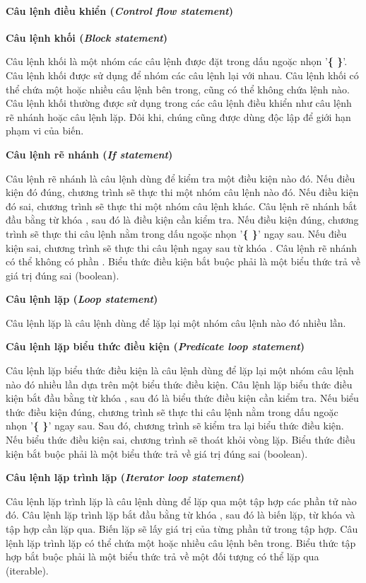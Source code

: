 \paragraph{Câu lệnh điều khiển (\textit{Control flow statement})}

\noindent\textbf{Câu lệnh khối (\textit{Block statement})}

\regexblockstmt

Câu lệnh khối là một nhóm các câu lệnh được đặt trong dấu ngoặc nhọn '\textbf{\{ \}}'. Câu lệnh khối được sử dụng để nhóm các câu lệnh lại với nhau. Câu lệnh khối có thể chứa một hoặc nhiều câu lệnh bên trong, cũng có thể không chứa lệnh nào. Câu lệnh khối thường được sử dụng trong các câu lệnh điều khiển như câu lệnh rẽ nhánh hoặc câu lệnh lặp. Đôi khi, chúng cũng được dùng độc lập để giới hạn phạm vi của biến.

\noindent\textbf{Câu lệnh rẽ nhánh (\textit{If statement})}

\regexifstmt

Câu lệnh rẽ nhánh là câu lệnh dùng để kiểm tra một điều kiện nào đó. Nếu điều kiện đó đúng, chương trình sẽ thực thi một nhóm câu lệnh nào đó. Nếu điều kiện đó sai, chương trình sẽ thực thi một nhóm câu lệnh khác. Câu lệnh rẽ nhánh bắt đầu bằng từ khóa , sau đó là điều kiện cần kiểm tra. Nếu điều kiện đúng, chương trình sẽ thực thi câu lệnh nằm trong dấu ngoặc nhọn '\textbf{\{ \}}' ngay sau. Nếu điều kiện sai, chương trình sẽ thực thi câu lệnh ngay sau từ khóa . Câu lệnh rẽ nhánh có thể không có phần . Biểu thức điều kiện bắt buộc phải là một biểu thức trả về giá trị đúng sai (boolean).

\noindent\textbf{Câu lệnh lặp (\textit{Loop statement})}

\regexloopstmt

Câu lệnh lặp là câu lệnh dùng để lặp lại một nhóm câu lệnh nào đó nhiều lần.

\noindent\textbf{Câu lệnh lặp biểu thức điều kiện (\textit{Predicate loop statement})}

\regexpredloopstmt

Câu lệnh lặp biểu thức điều kiện là câu lệnh dùng để lặp lại một nhóm câu lệnh nào đó nhiều lần dựa trên một biểu thức điều kiện. Câu lệnh lặp biểu thức điều kiện bắt đầu bằng từ khóa , sau đó là biểu thức điều kiện cần kiểm tra. Nếu biểu thức điều kiện đúng, chương trình sẽ thực thi câu lệnh nằm trong dấu ngoặc nhọn '\textbf{\{ \}}' ngay sau. Sau đó, chương trình sẽ kiểm tra lại biểu thức điều kiện. Nếu biểu thức điều kiện sai, chương trình sẽ thoát khỏi vòng lặp. Biểu thức điều kiện bắt buộc phải là một biểu thức trả về giá trị đúng sai (boolean).

\noindent\textbf{Câu lệnh lặp trình lặp (\textit{Iterator loop statement})}

\regexiterloopstmt

Câu lệnh lặp trình lặp là câu lệnh dùng để lặp qua một tập hợp các phần tử nào đó. Câu lệnh lặp trình lặp bắt đầu bằng từ khóa , sau đó là biến lặp, từ khóa  và tập hợp cần lặp qua. Biến lặp sẽ lấy giá trị của từng phần tử trong tập hợp. Câu lệnh lặp trình lặp có thể chứa một hoặc nhiều câu lệnh bên trong. Biểu thức tập hợp bắt buộc phải là một biểu thức trả về một đối tượng có thể lặp qua (iterable).
